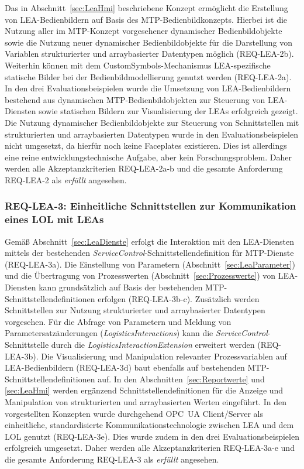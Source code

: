 Das in Abschnitt~\ref{sec:LeaHmi} beschriebene Konzept ermöglicht die Erstellung von LEA-Bedienbildern auf Basis des MTP-Bedienbildkonzepts. Hierbei ist die Nutzung aller im MTP-Konzept vorgesehener dynamischer Bedienbildobjekte sowie die Nutzung neuer dynamischer Bedienbildobjekte für die Darstellung von Variablen strukturierter und arraybasierter Datentypen möglich (REQ-LEA-2b). Weiterhin können mit dem CustomSymbols-Mechanismus LEA-spezifische statische Bilder bei der Bedienbildmodellierung genutzt werden (REQ-LEA-2a). In den drei Evaluationsbeispielen wurde die Umsetzung von LEA-Bedienbildern bestehend aus dynamischen MTP-Bedienbildobjekten zur Steuerung von LEA-Diensten sowie statischen Bildern zur Visualisierung der LEAs erfolgreich gezeigt. Die Nutzung dynamischer Bedienbildobjekte zur Steuerung von Schnittstellen mit strukturierten und arraybasierten Datentypen wurde in den Evaluationsbeispielen nicht umgesetzt, da hierfür noch keine Faceplates existieren. Dies ist allerdings eine reine entwicklungstechnische Aufgabe, aber kein Forschungsproblem. Daher werden alle Akzeptanzkriterien REQ-LEA-2a-b und die gesamte Anforderung REQ-LEA-2 als \emph{erfüllt} angesehen.

\subsubsection{REQ-LEA-3: Einheitliche Schnittstellen zur Kommunikation eines LOL mit LEAs}

Gemäß Abschnitt~\ref{sec:LeaDienste} erfolgt die Interaktion mit den LEA-Diensten mittels der bestehenden \emph{ServiceControl}-Schnittstellendefinition für MTP-Dienste (REQ-LEA-3a). Die Einstellung von Parametern (Abschnitt~\ref{sec:LeaParameter}) und die Übertragung von Prozesswerten (Abschnitt~\ref{sec:Prozesswerte}) von LEA-Diensten kann grundsätzlich auf Basis der bestehenden MTP-Schnittstellendefinitionen erfolgen (REQ-LEA-3b-c). Zusätzlich werden Schnittstellen zur Nutzung strukturierter und arraybasierter Datentypen vorgesehen. Für die Abfrage von Parametern und Meldung von Parametersatzänderungen (\emph{LogisticsInteractions}) kann die \emph{ServiceControl}-Schnittstelle durch die \emph{LogisticsInteractionExtension} erweitert werden (REQ-LEA-3b). Die Visualisierung und Manipulation relevanter Prozessvariablen auf LEA-Bedienbildern (REQ-LEA-3d) baut ebenfalls auf bestehenden MTP-Schnittstellendefinitionen auf. In den Abschnitten~\ref{sec:Reportwerte} und \ref{sec:LeaHmi} werden ergänzend Schnittstellendefinitionen für die Anzeige und Manipulation von strukturierten und arraybasierten Werten eingeführt. In den vorgestellten Konzepten wurde durchgehend OPC~UA Client/Server als einheitliche, standardisierte Kommunikationstechnologie zwischen LEA und dem LOL genutzt (REQ-LEA-3e). Dies wurde zudem in den drei Evaluationsbeispielen erfolgreich umgesetzt. Daher werden alle Akzeptanzkriterien REQ-LEA-3a-e und die gesamte Anforderung REQ-LEA-3 als \emph{erfüllt} angesehen.

